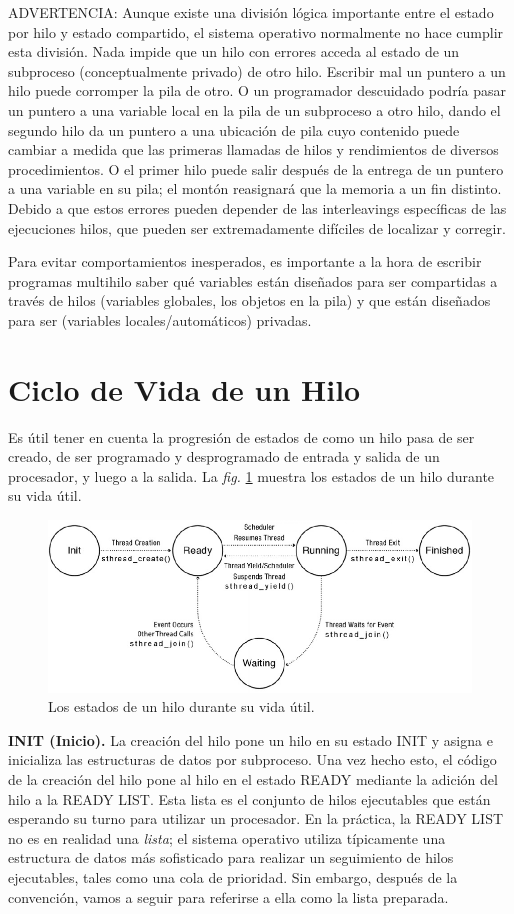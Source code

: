 \documentclass[10pt]{book}
\begin{document}
ADVERTENCIA: Aunque existe una división lógica importante entre el estado por hilo y estado compartido, el sistema operativo normalmente no hace cumplir esta división. Nada impide que un hilo con errores acceda al estado de un subproceso (conceptualmente privado) de otro hilo. Escribir mal un puntero a un hilo puede corromper la pila de otro. O un programador descuidado podría pasar un puntero a una variable local en la pila de un subproceso a otro hilo, dando el segundo hilo da un puntero a una ubicación de pila cuyo contenido puede cambiar a medida que las primeras llamadas de hilos y rendimientos de diversos procedimientos. O el primer hilo puede salir después de la entrega de un puntero a una variable en su pila; el montón reasignará que la memoria a un fin distinto. Debido a que estos errores pueden depender de las interleavings específicas de las ejecuciones hilos, que pueden ser extremadamente difíciles de localizar y corregir.

Para evitar comportamientos inesperados, es importante a la hora de escribir programas multihilo saber qué variables están diseñados para ser compartidas a través de hilos (variables globales, los objetos en la pila) y que están diseñados para ser (variables locales/automáticos) privadas.

\section{Ciclo de Vida de un Hilo}
Es útil tener en cuenta la progresión de estados de como un hilo pasa de ser creado, de ser programado y desprogramado de entrada y salida de un procesador, y luego a la salida. La \textit{fig.} \ref{fig17} muestra los estados de un hilo durante su vida útil.
\begin{figure}[tbhp]
\centerline{\includegraphics[scale=0.45]{img/fig17}}
\caption{Los estados de un hilo durante su vida útil.}
\label{fig17}
\end{figure}

\textbf{INIT (Inicio).} La creación del hilo pone un hilo en su estado INIT y asigna e inicializa las estructuras de datos por subproceso. Una vez hecho esto, el código de la creación del hilo pone al hilo en el estado READY mediante la adición del hilo a la READY LIST. Esta lista es el conjunto de hilos ejecutables que están esperando su turno para utilizar un procesador. En la práctica, la READY LIST no es en realidad una \textit{lista}; el sistema operativo utiliza típicamente una estructura de datos más sofisticado para realizar un seguimiento de hilos ejecutables, tales como una cola de prioridad. Sin embargo, después de la convención, vamos a seguir para referirse a ella como la lista preparada.
\end{document}
